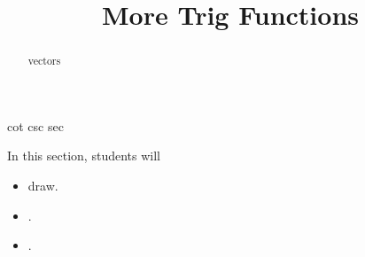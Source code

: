 \documentclass{ximera}
\title{More Trig Functions}
\begin{document}
\begin{abstract}
vectors
\end{abstract}
\maketitle



cot csc sec

\begin{sectionOutcomes}
In this section, students will 

\begin{itemize}
\item draw.
\item .
\item .
\end{itemize}
\end{sectionOutcomes}
\end{document}
